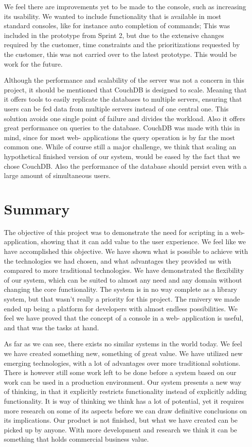We feel there are improvements yet to be made to the console, such as increasing its usability. We wanted to include functionality that is available in most standard consoles, like for instance auto completion of commands; This was included in the prototype from Sprint 2, but due to the extensive changes required by the customer, time constraints and the prioritizations requested by the customer, this was not carried over to the latest prototype. This would be work for the future.

Although the performance and scalability of the server was not a concern in this project, it should be mentioned that CouchDB is designed to scale. Meaning that it offers tools to easily replicate the databases to multiple servers, ensuring that users can be fed data from multiple servers instead of one central one. This solution avoids one single point of failure and divides the workload. Also it offers great performance on queries to the database. CouchDB was made with this in mind, since for most web- applications the query operation is by far the most common one. While of course still a major challenge, we think that scaling an hypothetical finished version of our system, would be eased by the fact that we chose CouchDB. Also the performance of the database should persist even with a large amount of simultaneous users.


\section{Summary}
The objective of this project was to demonstrate the need for scripting in a web- application, showing that it can add value to the user experience. We feel like we have accomplished this objective. We have shown what is possible to achieve with the technologies we had chosen, and what advantages they provided us with compared to more traditional technologies. We have demonstrated the flexibility of our system, which can be suited to almost any need and any domain without changing the core functionality. The system is in no way complete as a library system, but that wasn’t really a priority for this project. The rmivery we made ended up being a platform for developers with almost endless possibilities. We feel we have proved that the concept of a console in a web- application is useful, and that was the tasks at hand.

As far as we can see, there exists no similar systems in the world today. We feel we have created something new, something of great value. We have utilized new emerging technologies, with a lot of advantages over more traditional solutions. There is however still some work left to be done before a system based on our work can be used in a production environment. Our system presents a new way of thinking, in that it explicitly restricts functionality instead of explicitly adding functionality. It is way of thinking we think has a lot of potential, yet it requires more research on some of its aspects before we can draw definitive conclusions on its implications. Our product is not finished, but what we have created can be picked up by anyone. With more development and research we think it can be something that holds commercial business value.


